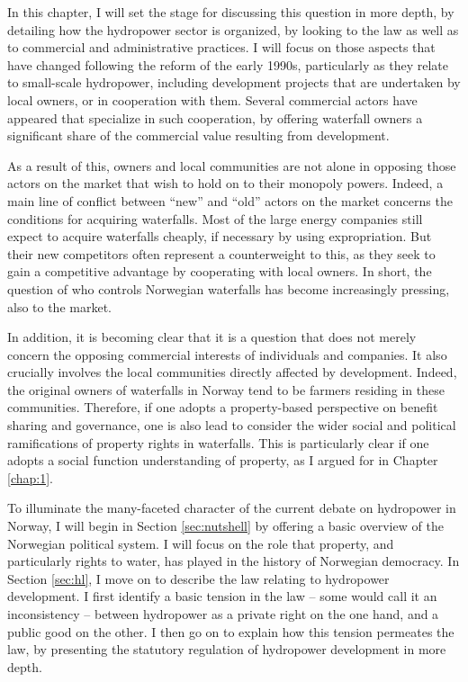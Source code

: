 In this chapter, I will set the stage for discussing this question in more depth, by detailing how the hydropower sector is organized, by looking to the law as well as to commercial and administrative practices. I will focus on those aspects that have changed following the reform of the early 1990s, particularly as they relate to small-scale hydropower, including development projects that are undertaken by local owners, or in cooperation with them. Several commercial actors have appeared that specialize in such cooperation, by offering waterfall owners a significant share of the commercial value resulting from development. 

As a result of this, owners and local communities are not alone in opposing those actors on the market that wish to hold on to their  monopoly powers. Indeed, a main line of conflict between ``new'' and ``old'' actors on the market concerns the conditions for acquiring waterfalls. Most of the large energy companies still expect to acquire waterfalls cheaply, if necessary by using expropriation. But their new competitors often represent a counterweight to this, as they seek to gain a competitive advantage by cooperating with local owners. In short, the question of who controls Norwegian waterfalls has become increasingly pressing, also to the market.

In addition, it is becoming clear that it is a question that does not merely concern the opposing commercial interests of individuals and companies. It also crucially involves the local communities directly affected by development. Indeed, the original owners of waterfalls in Norway tend to be farmers residing in these communities. Therefore, if one adopts a property-based perspective on benefit sharing and governance, one is also lead to consider the wider social and political ramifications of property rights in waterfalls. This is particularly clear if one adopts a social function understanding of property, as I argued for in Chapter \ref{chap:1}.

To illuminate the many-faceted character of the current debate on hydropower in Norway, I will begin in Section \ref{sec:nutshell} by offering a basic overview of the Norwegian political system. I will focus on the role that property, and particularly rights to water, has played in the history of Norwegian democracy. In Section \ref{sec:hl}, I move on to describe the law relating to hydropower development. I first identify a basic tension in the law -- some would call it an inconsistency -- between hydropower as a private right on the one hand, and a public good on the other. I then go on to explain how this tension permeates the law, by presenting the statutory regulation of hydropower development in more depth.

